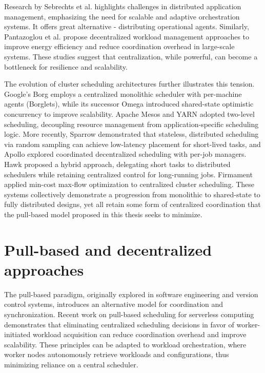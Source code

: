Research by Sebrechts et al. \cite{sebrechts2018orchestrator} highlights challenges in distributed application management, emphasizing the need for scalable and adaptive orchestration systems. It offers great alternative - distributing operational agents. Similarly, Pantazoglou et al. \cite{pantazoglou2015decentralized} propose decentralized workload management approaches to improve energy efficiency and reduce coordination overhead in large-scale systems. These studies suggest that centralization, while powerful, can become a bottleneck for resilience and scalability.

The evolution of cluster scheduling architectures further illustrates this tension. Google's Borg \cite{verma2015borg} employs a centralized monolithic scheduler with per-machine agents (Borglets), while its successor Omega \cite{schwarzkopf2013omega} introduced shared-state optimistic concurrency to improve scalability. Apache Mesos \cite{hindman2011mesos} and YARN \cite{vavilapalli2013yarn} adopted two-level scheduling, decoupling resource management from application-specific scheduling logic. More recently, Sparrow \cite{ousterhout2013sparrow} demonstrated that stateless, distributed scheduling via random sampling can achieve low-latency placement for short-lived tasks, and Apollo \cite{boutin2015apollo} explored coordinated decentralized scheduling with per-job managers. Hawk \cite{delgado2015hawk} proposed a hybrid approach, delegating short tasks to distributed schedulers while retaining centralized control for long-running jobs. Firmament \cite{gog2016firmament} applied min-cost max-flow optimization to centralized cluster scheduling. These systems collectively demonstrate a progression from monolithic to shared-state to fully distributed designs, yet all retain some form of centralized coordination that the pull-based model proposed in this thesis seeks to minimize.

\section{Pull-based and decentralized approaches}

The pull-based paradigm, originally explored in software engineering and version control systems, introduces an alternative model for coordination and synchronization. Recent work on pull-based scheduling for serverless computing \cite{hiku2025pull} demonstrates that eliminating centralized scheduling decisions in favor of worker-initiated workload acquisition can reduce coordination overhead and improve scalability. These principles can be adapted to workload orchestration, where worker nodes autonomously retrieve workloads and configurations, thus minimizing reliance on a central scheduler.

